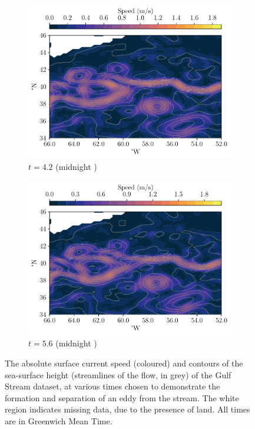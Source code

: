 \begin{figure}
\begin{center}
\begin{subfigure}{0.49\textwidth}
			\includegraphics[width=\textwidth]{chp06_applications/figures/gulf_stream/streamlines_4}
			\caption{\(t = 4.2\) (midnight )}
		\end{subfigure}
		\begin{subfigure}{0.49\textwidth}
			\includegraphics[width=\textwidth]{chp06_applications/figures/gulf_stream/streamlines_6}
			\caption{\(t =5.6\) (midnight )}
		\end{subfigure}
		\caption{The absolute surface current speed (coloured) and contours of the sea-surface height (streamlines of the flow, in grey) of the Gulf Stream dataset, at various times chosen to demonstrate the formation and separation of an eddy from the stream.
			The white region indicates missing data, due to the presence of land.
			All times are in Greenwich Mean Time.}
		\label{fig:na_motive_flow}
	\end{center}
\end{figure}




